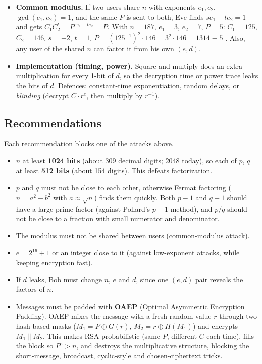 \begin{itemize}[leftmargin=1.4em]
  \item \textbf{Common modulus.} If two users share $n$ with exponents $e_1, e_2$, $\gcd(e_1, e_2) = 1$, and the same $P$ is sent to both, Eve finds $s e_1 + t e_2 = 1$ and gets $C_1^s C_2^t = P^{s e_1 + t e_2} = P$. With $n = 187$, $e_1 = 3$, $e_2 = 7$, $P = 5$: $C_1 = 125$, $C_2 = 146$, $s = -2$, $t = 1$, $P = (125^{-1})^2 \cdot 146 = 3^2 \cdot 146 = 1314 \equiv 5$ \checkmark. Also, any user of the shared $n$ can factor it from his own $(e, d)$.
  \item \textbf{Implementation (timing, power).} Square-and-multiply does an extra multiplication for every 1-bit of $d$, so the decryption time or power trace leaks the bits of $d$. Defences: constant-time exponentiation, random delays, or \emph{blinding} (decrypt $C \cdot r^e$, then multiply by $r^{-1}$).
\end{itemize}

\subsection{Recommendations}
Each recommendation blocks one of the attacks above.
\begin{itemize}[leftmargin=1.4em]
  \item $n$ at least \textbf{1024 bits} (about 309 decimal digits; 2048 today), so each of $p$, $q$ at least \textbf{512 bits} (about 154 digits). This defeats factorization.
  \item $p$ and $q$ must not be close to each other, otherwise Fermat factoring ($n = a^2 - b^2$ with $a \approx \sqrt n$) finds them quickly. Both $p - 1$ and $q - 1$ should have a large prime factor (against Pollard's $p - 1$ method), and $p/q$ should not be close to a fraction with small numerator and denominator.
  \item The modulus must not be shared between users (common-modulus attack).
  \item $e = 2^{16} + 1$ or an integer close to it (against low-exponent attacks, while keeping encryption fast).
  \item If $d$ leaks, Bob must change $n$, $e$ and $d$, since one $(e, d)$ pair reveals the factors of $n$.
  \item Messages must be padded with \textbf{OAEP} (Optimal Asymmetric Encryption Padding). OAEP mixes the message with a fresh random value $r$ through two hash-based masks ($M_1 = P \oplus G(r)$, $M_2 = r \oplus H(M_1)$) and encrypts $M_1 \| M_2$. This makes RSA probabilistic (same $P$, different $C$ each time), fills the block so $P^e > n$, and destroys the multiplicative structure, blocking the short-message, broadcast, cyclic-style and chosen-ciphertext tricks.
\end{itemize}


